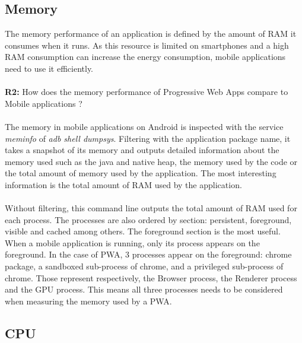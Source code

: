 \documentclass{kththesis}
\begin{document}
\subsection{Memory}

The memory performance of an application is defined by the amount of RAM it consumes when it runs. As this resource is limited on smartphones and a high RAM consumption can increase the energy consumption, mobile applications need to use it efficiently. 
\paragraph{}
\textbf{R2:} How does the memory performance of Progressive Web Apps compare to Mobile applications ?

\paragraph{}
The memory in mobile applications on Android is inspected with the service \textit{meminfo} of \textit{adb shell dumpsys}. Filtering with the application package name, it takes a snapshot of its memory and outputs detailed information about the memory used such as the java and native heap, the memory used by the code or the total amount of memory used by the application. The most interesting information is the total amount of RAM used by the application.

\paragraph{}
Without filtering, this command line outputs the total amount of RAM used for each process. The processes are also ordered by section: persistent, foreground, visible and cached among others. \newline
The foreground section is the most useful. When a mobile application is running, only its process appears on the foreground. In the case of PWA, 3 processes appear on the foreground:  chrome package, a sandboxed sub-process of chrome, and a privileged sub-process of chrome. Those represent respectively, the Browser process, the Renderer process and the GPU process. This means all three processes needs to be considered when measuring the memory used by a PWA. 
    
\subsection{CPU}
\end{document}
